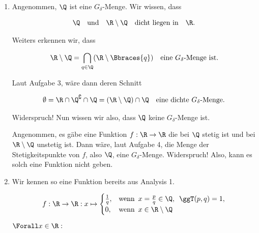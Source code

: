 \begin{solution}

\phantom{}

\begin{enumerate}[label = (\roman*)]

  \item
  Angenommen, $\Q$ ist eine $G_\delta$-Menge.
  Wir wissen, dass

  \begin{align*}
    \Q \quad \textrm{und} \quad \R \setminus \Q
    \quad
    \textrm{dicht liegen in}
    \quad
    \R.
  \end{align*}

  Weiters erkennen wir, dass

  \begin{align*}
    \R \setminus \Q
    =
    \bigcap_{q \in \Q}( \R \setminus \Bbraces{q})
    \quad
    \textrm{eine $G_\delta$-Menge ist.}
  \end{align*}

  Laut Aufgabe 3, wäre dann deren Schnitt

  \begin{align*}
    \emptyset
    =
    \R \cap \Q^\complement \cap \Q
    =
    (\R \setminus \Q) \cap \Q \quad \textrm{eine dichte $G_\delta$-Menge.}
  \end{align*}

  Widerspruch!
  Nun wissen wir also, dass $\Q$ keine $G_\delta$-Menge ist.

  Angenommen, es gäbe eine Funktion $f: \R \to \R$ die bei $\Q$ stetig ist und bei $\R \setminus \Q$ unstetig ist.
  Dann wäre, laut Aufgabe 4, die Menge der Stetigkeitspunkte von $f$, also $\Q$, eine $G_\delta$-Menge.
  Widerspruch!
  Also, kann es solch eine Funktion nicht geben.

  \item
  Wir kennen so eine Funktion bereits aus Analysis 1.

  \begin{align*}
    f:
    \R \to \R:
    x \mapsto
    \begin{cases}
      \frac{1}{q},
      & \textrm{wenn} \enspace
      x = \frac{p}{q} \in \Q, \enspace \ggT(p, q) = 1, \\
      0,
      & \textrm{wenn} \enspace
      x \in \R \setminus \Q
    \end{cases}
  \end{align*}

  $\Forall x \in \R:$

  \begin{itemize}


\end{itemize}
\end{enumerate}
\end{solution}

